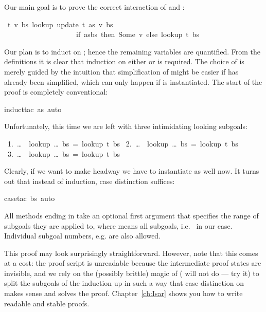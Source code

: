 \begin{isabellebody}
\begin{isamarkuptext}
Our main goal is to prove the correct interaction of  and
:%
\end{isamarkuptext}%
\ {\isachardoublequote}{\isasymforall}t\ v\ bs{\isachardot}\ lookup\ {\isacharparenleft}update\ t\ as\ v{\isacharparenright}\ bs\ {\isacharequal}\isanewline
\ \ \ \ \ \ \ \ \ \ \ \ \ \ \ \ \ \ \ \ {\isacharparenleft}if\ as{\isacharequal}bs\ then\ Some\ v\ else\ lookup\ t\ bs{\isacharparenright}{\isachardoublequote}%
\begin{isamarkuptxt}%
\noindent
Our plan is to induct on ; hence the remaining variables are
quantified. From the definitions it is clear that induction on either
 or  is required. The choice of  is merely
guided by the intuition that simplification of  might be easier
if  has already been simplified, which can only happen if
 is instantiated.
The start of the proof is completely conventional:%
\end{isamarkuptxt}%
induct{\isacharunderscore}tac\ as{\isacharcomma}\ auto{\isacharparenright}%
\begin{isamarkuptxt}%
\noindent
Unfortunately, this time we are left with three intimidating looking subgoals:
\begin{isabelle}
~1.~\dots~{\isasymLongrightarrow}~lookup~\dots~bs~=~lookup~t~bs\isanewline
~2.~\dots~{\isasymLongrightarrow}~lookup~\dots~bs~=~lookup~t~bs\isanewline
~3.~\dots~{\isasymLongrightarrow}~lookup~\dots~bs~=~lookup~t~bs
\end{isabelle}
Clearly, if we want to make headway we have to instantiate  as
well now. It turns out that instead of induction, case distinction
suffices:%
\end{isamarkuptxt}%
case{\isacharunderscore}tac{\isacharbrackleft}{\isacharbang}{\isacharbrackright}\ bs{\isacharcomma}\ auto{\isacharparenright}\isanewline
{}%
\begin{isamarkuptext}%
\noindent
All methods ending in  take an optional first argument that
specifies the range of subgoals they are applied to, where \isa{{\isacharbrackleft}{\isacharbang}{\isacharbrackright}} means
all subgoals, i.e.\  in our case. Individual subgoal numbers,
e.g.  are also allowed.

This proof may look surprisingly straightforward. However, note that this
comes at a cost: the proof script is unreadable because the intermediate
proof states are invisible, and we rely on the (possibly brittle) magic of
 ( will not do --- try it) to split the subgoals
of the induction up in such a way that case distinction on  makes
sense and solves the proof. Chapter~\ref{ch:Isar} shows you how to write readable
and stable proofs.


\end{isamarkuptext}
\end{isabellebody}
